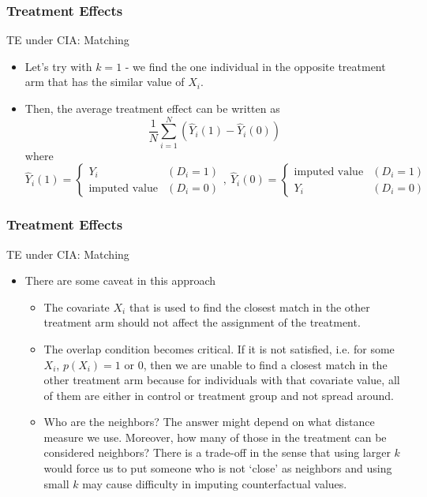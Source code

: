 \documentclass{beamer}
\begin{document}
\begin{frame}
\frametitle{Treatment Effects}
TE under CIA: Matching
\begin{itemize}
\item Let's try with $k=1$ - we find the one individual in the opposite treatment arm that has the similar value of $X_i$.
\item Then, the average treatment effect can be written as
\[
\frac{1}{N}\sum_{i=1}^N(\hat{Y}_i(1)-\hat{Y}_i(0))
\]
where
\footnotesize{\[
\hat{Y}_i(1)=\begin{cases} Y_i & (D_i=1) \\ \text{imputed value} & (D_i=0)\end{cases}, \ \hat{Y}_i(0)=\begin{cases} \text{imputed value} & (D_i=1) \\ Y_i & (D_i=0)\end{cases}
\]}\normalsize
\end{itemize}
\end{frame}

\begin{frame}
\frametitle{Treatment Effects}
TE under CIA: Matching
\begin{itemize}
\item There are some caveat in this approach
\begin{itemize}
\item The covariate $X_i$ that is used to find the closest match in the other treatment arm should not affect the assignment of the treatment. %
\item The overlap condition becomes critical. If it is not satisfied, i.e. for some $X_i$, $p(X_i)=1$ or $0$, then we are unable to find a closest match in the other treatment arm because for individuals with that covariate value, all of them are either in control or treatment group and not spread around. 
\item Who are the neighbors? The answer might depend on what distance measure we use. Moreover, how many of those in the treatment can be considered neighbors? There is a trade-off in the sense that using larger $k$ would force us to put someone who is not `close' as neighbors and using small $k$ may cause difficulty in imputing counterfactual values. 
\end{itemize}
\end{itemize}
\end{frame}
\end{document}

